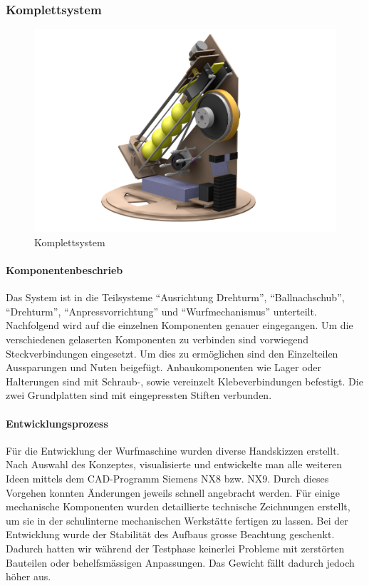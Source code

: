 \subsubsection{Komplettsystem}
\begin{figure}[h!]
	\centering
	\includegraphics[width=\linewidth]{../../fig/Render_Komplettsystem_5}
	\caption{Komplettsystem}
	\label{fig:Komplettsystem}
\end{figure}
\paragraph{Komponentenbeschrieb}
Das System ist in die Teilsysteme "`Ausrichtung Drehturm"', "`Ballnachschub"', "`Drehturm"', "`Anpressvorrichtung"' und "`Wurfmechanismus"' unterteilt. Nachfolgend wird auf die einzelnen Komponenten genauer eingegangen. Um die verschiedenen gelaserten Komponenten zu verbinden sind vorwiegend Steckverbindungen eingesetzt. Um dies zu ermöglichen sind den Einzelteilen Aussparungen und Nuten beigefügt. Anbaukomponenten wie Lager oder Halterungen sind mit Schraub-, sowie vereinzelt Klebeverbindungen befestigt. Die zwei Grundplatten sind mit eingepressten Stiften verbunden.

\paragraph{Entwicklungsprozess}
Für die Entwicklung der Wurfmaschine wurden diverse Handskizzen erstellt. Nach Auswahl des Konzeptes, visualisierte und entwickelte man alle weiteren Ideen mittels dem CAD-Programm Siemens NX8 bzw. NX9. Durch dieses Vorgehen konnten Änderungen jeweils schnell angebracht werden. Für einige mechanische Komponenten wurden detaillierte technische Zeichnungen erstellt, um sie in der schulinterne mechanischen Werkstätte fertigen zu lassen. Bei der Entwicklung wurde der Stabilität des Aufbaus grosse Beachtung geschenkt. Dadurch hatten wir während der Testphase keinerlei Probleme mit zerstörten Bauteilen oder behelfsmässigen Anpassungen. Das Gewicht fällt dadurch jedoch höher aus. 